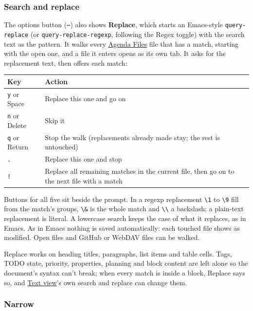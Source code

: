 \documentclass[11pt]{article}
\begin{document}
\subsubsection{Search and replace}
\label{sec:org14fb5c3}

The options button (\texttt{⋯}) also shows \textbf{Replace}, which starts an Emacs-style \texttt{query-replace} (or \texttt{query-replace-regexp}, following the Regex toggle) with the search text as the pattern. It walks every \hyperref[sec:org4d24003]{Agenda Files} file that has a match, starting with the open one, and a file it enters opens as its own tab. It asks for the replacement text, then offers each match:

\begin{center}
\begin{tabular}{ll}
Key & Action\\[0pt]
\hline
\texttt{y} or Space & Replace this one and go on\\[0pt]
\texttt{n} or Delete & Skip it\\[0pt]
\texttt{q} or Return & Stop the walk (replacements already made stay; the rest is untouched)\\[0pt]
\texttt{.} & Replace this one and stop\\[0pt]
\texttt{!} & Replace all remaining matches in the current file, then go on to the next file with a match\\[0pt]
\end{tabular}
\end{center}

Buttons for all five sit beside the prompt. In a regexp replacement \texttt{\textbackslash{}1} to \texttt{\textbackslash{}9} fill from the match's groups, \texttt{\textbackslash{}\&} is the whole match and \texttt{\textbackslash{}\textbackslash{}} a backslash; a plain-text replacement is literal. A lowercase search keeps the case of what it replaces, as in Emacs. As in Emacs nothing is saved automatically: each touched file shows as modified. Open files and GitHub or WebDAV files can be walked.

Replace works on heading titles, paragraphs, list items and table cells. Tags, TODO state, priority, properties, planning and block content are left alone so the document's syntax can't break; when every match is inside a block, Replace says so, and \hyperref[sec:org0afb086]{Text view}'s own search and replace can change them.

\subsubsection{Narrow}
\label{sec:orgf27cffc}
\end{document}
